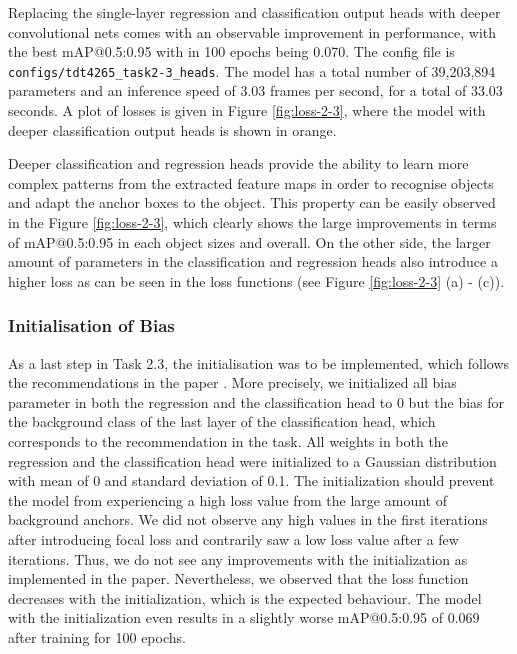 \documentclass{article}
\begin{document}
Replacing the single-layer regression and classification output heads with deeper convolutional nets comes with an observable improvement in performance, with the best mAP@0.5:0.95 with in 100 epochs being 0.070. The config file is \texttt{configs/tdt4265\_task2-3\_heads}. The model has a total number of 39,203,894 parameters and an inference speed of 3.03 frames per second, for a total of 33.03 seconds. A plot of losses is given in Figure \ref{fig:loss-2-3}, where the model with deeper classification output heads is shown in orange.

Deeper classification and regression heads provide the ability to learn more complex patterns from the extracted feature maps in order to recognise objects and adapt the anchor boxes to the object. This property can be easily observed in the Figure \ref{fig:loss-2-3}, which clearly shows the large improvements in terms of mAP@0.5:0.95 in each object sizes and overall. On the other side, the larger amount of parameters in the classification and regression heads also introduce a higher loss as can be seen in the loss functions (see Figure \ref{fig:loss-2-3} (a) - (c)).

\subsubsection*{Initialisation of Bias}

As a last step in Task 2.3, the initialisation was to be implemented, which follows the recommendations in the paper \cite{lin2017focal}. More precisely, we initialized all bias parameter in both the regression and the classification head to 0 but the bias for the background class of the last layer of the classification head, which corresponds to the recommendation in the task. All weights in both the regression and the classification head were initialized to a Gaussian distribution with mean of 0 and standard deviation of 0.1. The initialization should prevent the model from experiencing a high loss value from the large amount of background anchors. We did not observe any high values in the first iterations after introducing focal loss and contrarily saw a low loss value after a few iterations. Thus, we do not see any improvements with the initialization as implemented in the paper. Nevertheless, we observed that the loss function decreases with the initialization, which is the expected behaviour. The model with the initialization even results in a slightly worse mAP@0.5:0.95 of 0.069 after training for 100 epochs.
\end{document}
